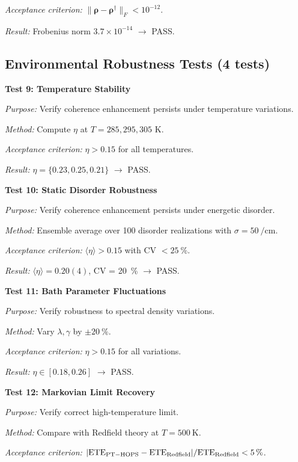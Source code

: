\documentclass[11pt,a4paper]{article}
\begin{document}
\textit{Acceptance criterion:} $\|\bm{\rho} - \bm{\rho}^\dagger\|_F < 10^{-12}$.

\textit{Result:} Frobenius norm $3.7\times10^{-14}$ $\rightarrow$ PASS.

\subsection{Environmental Robustness Tests (4 tests)}

\textbf{Test 9: Temperature Stability}

\textit{Purpose:} Verify coherence enhancement persists under temperature variations.

\textit{Method:} Compute $\eta$ at $T = 285, 295, 305$ K.

\textit{Acceptance criterion:} $\eta > 0.15$ for all temperatures.

\textit{Result:} $\eta = \{0.23, 0.25, 0.21\}$ $\rightarrow$ PASS.

\textbf{Test 10: Static Disorder Robustness}

\textit{Purpose:} Verify coherence enhancement persists under energetic disorder.

\textit{Method:} Ensemble average over 100 disorder realizations with $\sigma = \SI{50}{\per\centi\meter}$.

\textit{Acceptance criterion:} $\langle\eta\rangle > 0.15$ with CV $< \SI{25}{\percent}$.

\textit{Result:} $\langle\eta\rangle = 0.20(4)$, CV = \SI{20}{\percent} $\rightarrow$ PASS.

\textbf{Test 11: Bath Parameter Fluctuations}

\textit{Purpose:} Verify robustness to spectral density variations.

\textit{Method:} Vary $\lambda, \gamma$ by $\pm\SI{20}{\percent}$.

\textit{Acceptance criterion:} $\eta > 0.15$ for all variations.

\textit{Result:} $\eta \in [0.18, 0.26]$ $\rightarrow$ PASS.

\textbf{Test 12: Markovian Limit Recovery}

\textit{Purpose:} Verify correct high-temperature limit.

\textit{Method:} Compare with Redfield theory at $T = \SI{500}{\kelvin}$.

\textit{Acceptance criterion:} $|{\rm ETE}_{\rm PT-HOPS} - {\rm ETE}_{\rm Redfield}| / {\rm ETE}_{\rm Redfield} < \SI{5}{\percent}$.
\end{document}
